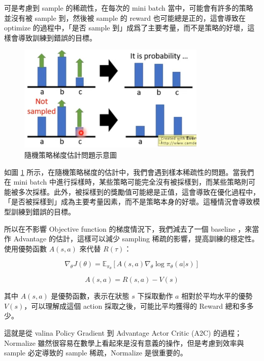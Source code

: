 可是考慮到 sample 的稀疏性，在每次的 mini batch 當中，可能會有許多的策略並沒有被 sample 到，然後被 sample 的 reward 也可能總是正的，這會導致在 optimize 的過程中，「是否 sample 到」成爲了主要考量，而不是策略的好壞，這樣會導致訓練到錯誤的目標。

\begin{figure}[h]
    \centering
    \includegraphics[width=0.8\textwidth]{figures/stochastic_issue.png}
    \caption{隨機策略梯度估計問題示意圖 \cite{lee2023drl}}
    \label{fig:stochastic_issue}
\end{figure}

如圖 \ref{fig:stochastic_issue} 所示，在隨機策略梯度的估計中，我們會遇到樣本稀疏性的問題。當我們在 mini batch 中進行採樣時，某些策略可能完全沒有被採樣到，而某些策略則可能被多次採樣。此外，被採樣到的獎勵值可能總是正值，這會導致在優化過程中，「是否被採樣到」成為主要考量因素，而不是策略本身的好壞。這種情況會導致模型訓練到錯誤的目標。

所以在不影響 Objective function 的梯度情況下，我們減去了一個 baseline ，來當作 Advantage 的估計，這樣可以減少 sampling 稀疏的影響，提高訓練的穩定性。使用優勢函數 $A(s,a)$ 來代替 $R(\tau)$：

\begin{equation}
    \nabla_\theta J(\theta) = \mathbb{E}_{\pi_\theta}[A(s,a)\nabla_\theta \log \pi_\theta(a|s) ]
\end{equation}

\begin{equation}
    A(s,a) = R(s,a) - V(s)
\end{equation}

其中 $A(s,a)$ 是優勢函數，表示在狀態 $s$ 下採取動作 $a$ 相對於平均水平的優勢$V(s)$，可以理解成這個 action 採取之後，可能比平均獲得的 Reward 總和多多少。

這就是從 valina Policy Gradient 到 Advantage Actor Critic (A2C) 的過程；Normalize 雖然很容易在數學上看起來是沒有意義的操作，但是考慮到效率與 sample 必定導致的 sample 稀疏，Normalize 是很重要的。

